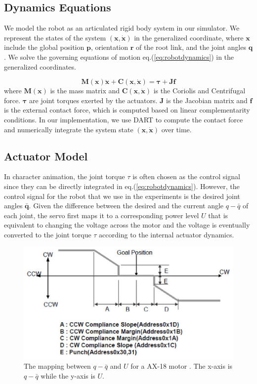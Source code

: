 \subsection{Dynamics Equations}

We model the robot as an articulated rigid body system in our simulator. We represent the states of the system $(\mathbf{x}, \dot{\mathbf{x}})$ in the generalized coordinate, where $\mathbf{x}$ include the global position $\mathbf{p}$, orientation $\mathbf{r}$ of the root link, and the joint angles $\mathbf{q}$. We solve the governing equations of motion eq.(\ref{eq:robotdynamics}) in the generalized coordinates.

\begin{equation}
\label{eq:robotdynamics}
\mathbf{M}(\mathbf{x})\mathbf{\ddot{x}}+\mathbf{C}(\mathbf{x},\mathbf{\dot{x}})=\mathbf{\tau}+\mathbf{Jf}
\end{equation}
where $\mathbf{M}(\mathbf{x})$ is the mass matrix and $\mathbf{C}(\mathbf{x},\mathbf{\dot{x}})$ is the Coriolis and Centrifugal force. $\mathbf{\tau}$ are joint torques exerted by the actuators. $\mathbf{J}$ is the Jacobian matrix and $\mathbf{f}$ is the external contact force, which is computed based on linear complementarity conditions. In our implementation, we use DART to compute the contact force and numerically integrate the system state $(\mathbf{x}, \dot{\mathbf{x}})$ over time.

\subsection{Actuator Model}

In character animation, the joint torque $\tau$ is often chosen as the control signal since they can be directly integrated in eq.(\ref{eq:robotdynamics}). However, the control signal for the robot that we use in the experiments is the desired joint angles $\bar{\mathbf{q}}$. Given the difference between the desired and the current angle ${q-\bar{q}}$ of each joint, the servo first maps it to a corresponding power level $U$ that is equivalent to changing the voltage across the motor and the voltage is eventually converted to the joint torque $\tau$ according to the internal actuator dynamics.

\begin{figure}[t]
\centering
\includegraphics[width=5in]{figures/ax18gain.eps}
\caption{The mapping between $q-\bar{q}$ and $U$ for a AX-18 motor \cite{AX18:2015}. The x-axis is $q-\bar{q}$ while the y-axis is $U$.}
\label{fig:actuatorMap}
\end{figure}

